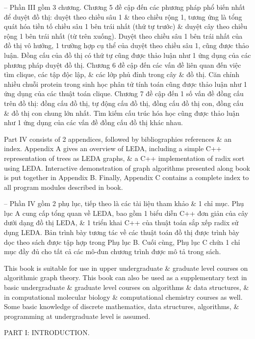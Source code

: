 \documentclass{article}
\begin{document}
\begin{itemize}
	-- Phần III gồm 3 chương. Chương 5 đề cập đến các phương pháp phổ biến nhất để duyệt đồ thị: duyệt theo chiều sâu 1 \& theo chiều rộng 1, tương ứng là tổng quát hóa tiền tố chiều sâu 1 bên trái nhất (thứ tự trước) \& duyệt cây theo chiều rộng 1 bên trái nhất (từ trên xuống). Duyệt theo chiều sâu 1 bên trái nhất của đồ thị vô hướng, 1 trường hợp cụ thể của duyệt theo chiều sâu 1, cũng được thảo luận. Đồng cấu của đồ thị có thứ tự cũng được thảo luận như 1 ứng dụng của các phương pháp duyệt đồ thị. Chương 6 đề cập đến các vấn đề liên quan đến việc tìm clique, các tập độc lập, \& các lớp phủ đỉnh trong cây \& đồ thị. Căn chỉnh nhiều chuỗi protein trong sinh học phân tử tính toán cũng được thảo luận như 1 ứng dụng của các thuật toán clique. Chương 7 đề cập đến 1 số vấn đề đồng cấu trên đồ thị: đồng cấu đồ thị, tự động cấu đồ thị, đồng cấu đồ thị con, đồng cấu \& đồ thị con chung lớn nhất. Tìm kiếm cấu trúc hóa học cũng được thảo luận như 1 ứng dụng của các vấn đề đồng cấu đồ thị khác nhau.
	
	Part IV consists of 2 appendices, followed by bibliographies references \& an index. Appendix A gives an overview of LEDA, including a simple C++ representation of trees as LEDA graphs, \& a C++ implementation of radix sort using LEDA. Interactive demonstration of graph algorithms presented along book is put together in Appendix B. Finally, Appendix C contains a complete index to all program modules described in book.
	
	-- Phần IV gồm 2 phụ lục, tiếp theo là các tài liệu tham khảo \& 1 chỉ mục. Phụ lục A cung cấp tổng quan về LEDA, bao gồm 1 biểu diễn C++ đơn giản của cây dưới dạng đồ thị LEDA, \& 1 triển khai C++ của thuật toán sắp xếp radix sử dụng LEDA. Bản trình bày tương tác về các thuật toán đồ thị được trình bày dọc theo sách được tập hợp trong Phụ lục B. Cuối cùng, Phụ lục C chứa 1 chỉ mục đầy đủ cho tất cả các mô-đun chương trình được mô tả trong sách.
	
	This book is suitable for use in upper undergraduate \& graduate level courses on algorithmic graph theory. This book can also be used as a supplementary text in basic undergraduate \& graduate level courses on algorithms \& data structures, \& in computational molecular biology \& computational chemistry courses as well. Some basic knowledge of discrete mathematics, data structures, algorithms, \& programming at undergraduate level is assumed.
	
	{\sf PART I: INTRODUCTION.}
	

\end{itemize}
\end{document}

